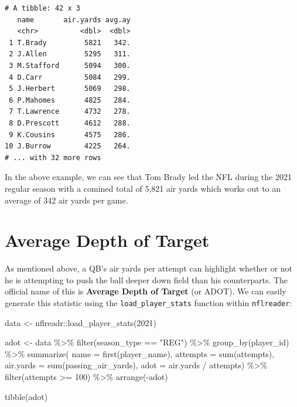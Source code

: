 \documentclass[
  letterpaper,
]{krantz}
\newenvironment{Shaded}{\begin{snugshade}}{\end{snugshade}}
\newcommand{\AttributeTok}[1]{\textcolor[rgb]{0.40,0.45,0.13}{#1}}
\newcommand{\DecValTok}[1]{\textcolor[rgb]{0.68,0.00,0.00}{#1}}
\newcommand{\FunctionTok}[1]{\textcolor[rgb]{0.28,0.35,0.67}{#1}}
\newcommand{\NormalTok}[1]{\textcolor[rgb]{0.00,0.23,0.31}{#1}}
\newcommand{\OtherTok}[1]{\textcolor[rgb]{0.00,0.23,0.31}{#1}}
\newcommand{\SpecialCharTok}[1]{\textcolor[rgb]{0.37,0.37,0.37}{#1}}
\newcommand{\StringTok}[1]{\textcolor[rgb]{0.13,0.47,0.30}{#1}}
\begin{document}
\begin{verbatim}
# A tibble: 42 x 3
   name       air.yards avg.ay
   <chr>          <dbl>  <dbl>
 1 T.Brady         5821   342.
 2 J.Allen         5295   311.
 3 M.Stafford      5094   300.
 4 D.Carr          5084   299.
 5 J.Herbert       5069   298.
 6 P.Mahomes       4825   284.
 7 T.Lawrence      4732   278.
 8 D.Prescott      4612   288.
 9 K.Cousins       4575   286.
10 J.Burrow        4225   264.
# ... with 32 more rows
\end{verbatim}

In the above example, we can see that Tom Brady led the NFL during the
2021 regular season with a comined total of 5,821 air yards which works
out to an average of 342 air yards per game.

\hypertarget{average-depth-of-target}{%
\section{Average Depth of Target}\label{average-depth-of-target}}

As mentioned above, a QB's air yards per attempt can highlight whether
or not he is attempting to push the ball deeper down field than his
counterparts. The official name of this is \textbf{Average Depth of
Target} (or ADOT). We can easily generate this statistic using the
\texttt{load\_player\_stats} function within \texttt{nflreader}:

\begin{Shaded}
\begin{Highlighting}[]
\NormalTok{data }\OtherTok{\textless{}{-}}\NormalTok{ nflreadr}\SpecialCharTok{::}\FunctionTok{load\_player\_stats}\NormalTok{(}\DecValTok{2021}\NormalTok{)}

\NormalTok{adot }\OtherTok{\textless{}{-}}\NormalTok{ data }\SpecialCharTok{\%\textgreater{}\%}
  \FunctionTok{filter}\NormalTok{(season\_type }\SpecialCharTok{==} \StringTok{"REG"}\NormalTok{) }\SpecialCharTok{\%\textgreater{}\%}
  \FunctionTok{group\_by}\NormalTok{(player\_id) }\SpecialCharTok{\%\textgreater{}\%}
  \FunctionTok{summarize}\NormalTok{(}
    \AttributeTok{name =} \FunctionTok{first}\NormalTok{(player\_name),}
    \AttributeTok{attempts =} \FunctionTok{sum}\NormalTok{(attempts),}
    \AttributeTok{air.yards =} \FunctionTok{sum}\NormalTok{(passing\_air\_yards),}
    \AttributeTok{adot =}\NormalTok{ air.yards }\SpecialCharTok{/}\NormalTok{ attempts) }\SpecialCharTok{\%\textgreater{}\%}
  \FunctionTok{filter}\NormalTok{(attempts }\SpecialCharTok{\textgreater{}=} \DecValTok{100}\NormalTok{) }\SpecialCharTok{\%\textgreater{}\%}
  \FunctionTok{arrange}\NormalTok{(}\SpecialCharTok{{-}}\NormalTok{adot)}

\FunctionTok{tibble}\NormalTok{(adot)}
\end{Highlighting}
\end{Shaded}
\end{document}
